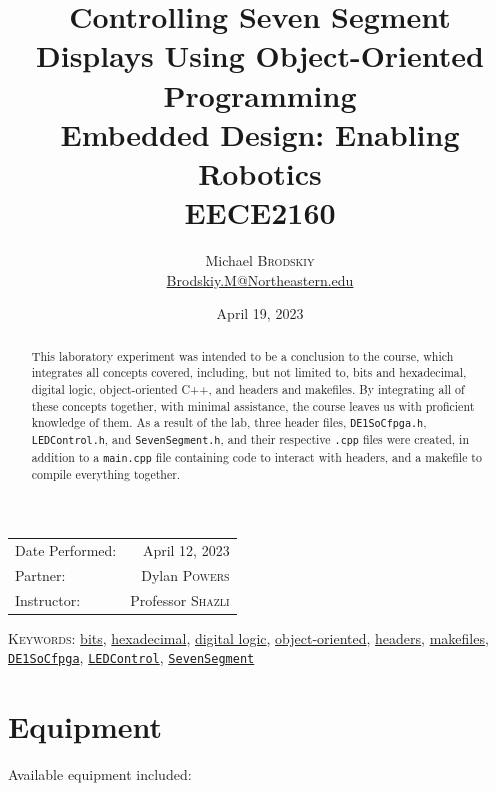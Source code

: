\documentclass[
	letterpaper, %
	10pt, %
]{CSUniSchoolLabReport}
\title{Controlling Seven Segment Displays Using Object-Oriented Programming\\ Embedded Design: Enabling Robotics \\ EECE2160} %
\author{Michael \textsc{Brodskiy}\\ \small \href{mailto:Brodskiy.M@Northeastern.edu}{Brodskiy.M@Northeastern.edu}}
\date{April 19, 2023} %
\begin{document}
\maketitle %

\begin{center}
	\begin{tabular}{l r}
		Date Performed: & April 12, 2023 \\ %
        Partner: & Dylan \textsc{Powers} \\ %
		Instructor: & Professor \textsc{Shazli} %
	\end{tabular}
\end{center}

\newpage

\begin{abstract}

  This laboratory experiment was intended to be a conclusion to the course, which integrates all concepts covered, including, but not limited to, bits and hexadecimal, digital logic, object-oriented C++, and headers and makefiles. By integrating all of these concepts together, with minimal assistance, the course leaves us with proficient knowledge of them. As a result of the lab, three header files, \texttt{DE1SoCfpga.h}, \texttt{LEDControl.h}, and \texttt{SevenSegment.h}, and their respective \texttt{.cpp} files were created, in addition to a \texttt{main.cpp} file containing code to interact with headers, and a makefile to compile everything together.

\end{abstract}

\begin{flushleft}

  \textsc{Keywords:} \underline{bits}, \underline{hexadecimal}, \underline{digital logic}, \underline{object-oriented}, \underline{headers}, \underline{makefiles}, \underline{\texttt{DE1SoCfpga}}, \underline{\texttt{LEDControl}}, \underline{\texttt{SevenSegment}} 

\end{flushleft}

\newpage

\section{Equipment}

\hspace{.5 in} Available equipment included:\\
\end{document}
